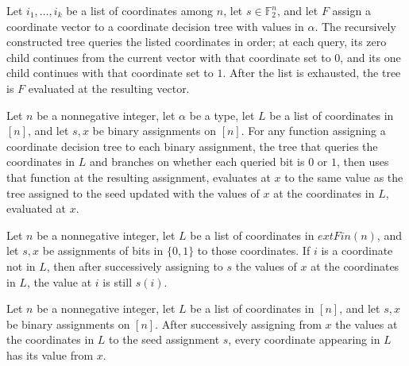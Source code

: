 \begin{definition}
\label{FABL.CoordinateDecisionTree.queryCoordinates}
\leanok
{}
Let $i_1,\ldots,i_k$ be a list of coordinates among $n$, let $s\in\mathbb F_2^n$, and
let $F$ assign a coordinate vector to a coordinate decision tree with values in
$\alpha$. The recursively constructed tree queries the listed coordinates in order; at
each query, its zero child continues from the current vector with that coordinate set to
$0$, and its one child continues with that coordinate set to $1$. After the list is
exhausted, the tree is $F$ evaluated at the resulting vector.
\end{definition}

\begin{theorem}
\label{FABL.CoordinateDecisionTree.eval_queryCoordinates}
\leanok
{}
Let $n$ be a nonnegative integer, let $\alpha$ be a type, let $L$ be a list of
coordinates in $[n]$, and let $s,x$ be binary assignments on $[n]$. For any function
assigning a coordinate decision tree to each binary assignment, the tree that queries
the coordinates in $L$ and branches on whether each queried bit is $0$ or $1$, then uses
that function at the resulting assignment, evaluates at $x$ to the same value as the
tree assigned to the seed updated with the values of $x$ at the coordinates in $L$,
evaluated at $x$.
\end{theorem}

\begin{theorem}
\label{FABL.CoordinateDecisionTree.assignCoordinates_apply_of_not_mem}
\leanok
{}
Let $n$ be a nonnegative integer, let $L$ be a list of coordinates in $	ext{Fin}(n)$,
and let $s,x$ be assignments of bits in $\{0,1\}$ to those coordinates. If $i$ is a
coordinate not in $L$, then after successively assigning to $s$ the values of $x$ at the
coordinates in $L$, the value at $i$ is still $s(i)$.
\end{theorem}

\begin{theorem}
\label{FABL.CoordinateDecisionTree.assignCoordinates_eq_on_mem}
\leanok
{}
Let $n$ be a nonnegative integer, let $L$ be a list of coordinates in $[n]$, and let
$s,x$ be binary assignments on $[n]$. After successively assigning from $x$ the values
at the coordinates in $L$ to the seed assignment $s$, every coordinate appearing in $L$
has its value from $x$.
\end{theorem}

